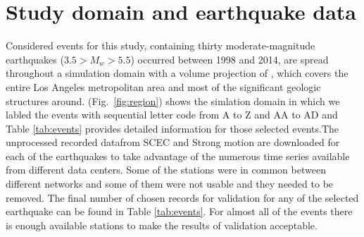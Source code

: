 
\section{Study domain and earthquake data}

Considered events for this study, containing thirty moderate-magnitude earthquakes ($3.5 > M_w > 5.5$) occurred between 1998 and 2014, are spread throughout a simulation domain with a volume projection of , which covers the entire Los Angeles metropolitan area and most of the significant geologic structures around. (Fig.~\ref{fig:region}) shows the simlation domain in which we labled the events with sequential letter code from A to Z and AA to AD and Table \ref{tab:events} provides detailed information for those selected events.The unprocessed recorded datafrom SCEC and Strong motion are downloaded for each of the earthquakes to take advantage of the numerous time series available from different data centers. Some of the stations were in common between different networks and some of them were not usable and they needed to be removed. The final number of chosen records for validation for any of the selected earthquake can be found in Table \ref{tab:events}. For almost all of the events there is enough  available stations to make the results of validation acceptable. 



